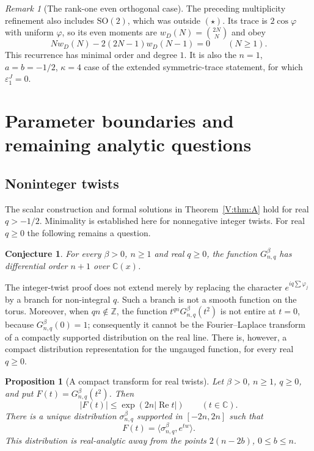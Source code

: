 \documentclass[11pt,a4paper]{article}
\newtheorem{proposition}[theorem]{Proposition}
\newtheorem{conjecture}[theorem]{Conjecture}
\theoremstyle{definition}
\theoremstyle{remark}
\newtheorem{remark}[theorem]{Remark}
\newcommand{\C}{\mathbb C}
\newcommand{\Z}{\mathbb Z}
\numberwithin{equation}{section}
\begin{document}
\begin{remark}[The rank-one even orthogonal case]
The preceding multiplicity refinement also includes $\mathrm{SO}(2)$,
which was outside $(\star)$. Its trace is $2\cos\varphi$ with uniform
$\varphi$, so its even moments are $w_D(N)=\binom{2N}{N}$ and obey
\[
 Nw_D(N)-2(2N-1)w_D(N-1)=0\qquad(N\ge1).
\]
This recurrence has minimal order and degree $1$. It is also the
$n=1$, $a=b=-1/2$, $\kappa=4$ case of the extended symmetric-trace
statement, for which $\varepsilon^J_1=0$.
\end{remark}

\section{Parameter boundaries and remaining analytic questions}\label{V:sec:open}
\subsection{Noninteger twists}
The scalar construction and formal solutions in Theorem~\ref{V:thm:A}
hold for real $q>-1/2$. Minimality is established here for nonnegative
integer twists. For real $q\ge0$ the following remains a question.
\begin{conjecture}
For every $\beta>0$, $n\ge1$ and real $q\ge0$, the function
$G^\beta_{n,q}$ has differential order $n+1$ over $\mathbb C(x)$.
\end{conjecture}

The integer-twist proof does not extend merely by replacing the character
$e^{iq\sum\varphi_j}$ by a branch for non-integral $q$.  Such a branch is
not a smooth function on the torus.  Moreover, when $qn\notin\Z$, the
function $t^{qn}G^\beta_{n,q}(t^2)$ is not entire at $t=0$, because
$G^\beta_{n,q}(0)=1$; consequently it cannot be the Fourier--Laplace
transform of a compactly supported distribution on the real line.
There is, however, a compact distribution representation for the
ungauged function, for every real $q\ge0$.

\begin{proposition}[A compact transform for real twists]
\label{V:prop:real-twist-compact}
Let $\beta>0$, $n\ge1$, $q\ge0$, and put
$F(t)=G^\beta_{n,q}(t^2)$.  Then
\[
  |F(t)|\le \exp(2n|\operatorname{Re}t|)\qquad(t\in\C).
\]
There is a unique distribution $\sigma^\beta_{n,q}$ supported in
$[-2n,2n]$ such that
\[
 F(t)=\langle\sigma^\beta_{n,q},e^{tw}\rangle.
\]
This distribution is real-analytic away from the points
$2(n-2b)$, $0\le b\le n$.
\end{proposition}
\end{document}
